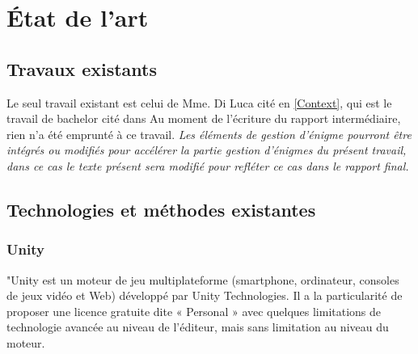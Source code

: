 \chapter{État de l'art}


\section{Travaux existants}

Le seul travail existant est celui de Mme. Di Luca cité en \ref{Context}, qui est le travail de bachelor cité dans  Au moment de l'écriture du rapport
intermédiaire, rien n'a été emprunté à ce travail. \textit{Les éléments de gestion d'énigme pourront être intégrés ou modifiés pour accélérer la partie gestion
    d'énigmes du présent travail, dans ce cas le texte présent sera modifié pour refléter ce cas dans le rapport final.}


\section{Technologies et méthodes existantes}
\subsection{Unity}
"Unity est un moteur de jeu multiplateforme (smartphone, ordinateur, consoles de jeux vidéo et Web) développé par Unity Technologies.
Il a la particularité de proposer une licence gratuite dite « Personal » avec quelques limitations de technologie avancée au niveau de l'éditeur,
mais sans limitation au niveau du moteur.

